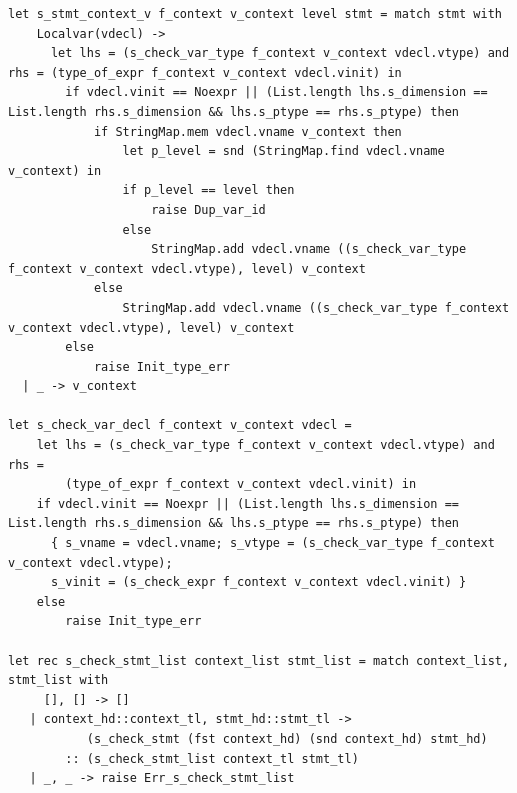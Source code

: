 \documentclass[a4paper,12pt]{article}
\begin{document}
\begin{lstlisting}
let s_stmt_context_v f_context v_context level stmt = match stmt with
    Localvar(vdecl) ->
      let lhs = (s_check_var_type f_context v_context vdecl.vtype) and rhs = (type_of_expr f_context v_context vdecl.vinit) in
        if vdecl.vinit == Noexpr || (List.length lhs.s_dimension == List.length rhs.s_dimension && lhs.s_ptype == rhs.s_ptype) then
            if StringMap.mem vdecl.vname v_context then
                let p_level = snd (StringMap.find vdecl.vname v_context) in
                if p_level == level then
                    raise Dup_var_id
                else
                    StringMap.add vdecl.vname ((s_check_var_type f_context v_context vdecl.vtype), level) v_context 
            else
                StringMap.add vdecl.vname ((s_check_var_type f_context v_context vdecl.vtype), level) v_context 
        else
            raise Init_type_err
  | _ -> v_context

let s_check_var_decl f_context v_context vdecl =
    let lhs = (s_check_var_type f_context v_context vdecl.vtype) and rhs =
        (type_of_expr f_context v_context vdecl.vinit) in
    if vdecl.vinit == Noexpr || (List.length lhs.s_dimension == List.length rhs.s_dimension && lhs.s_ptype == rhs.s_ptype) then
      { s_vname = vdecl.vname; s_vtype = (s_check_var_type f_context v_context vdecl.vtype); 
      s_vinit = (s_check_expr f_context v_context vdecl.vinit) }
    else
        raise Init_type_err

let rec s_check_stmt_list context_list stmt_list = match context_list, stmt_list with
     [], [] -> []
   | context_hd::context_tl, stmt_hd::stmt_tl -> 
           (s_check_stmt (fst context_hd) (snd context_hd) stmt_hd)
        :: (s_check_stmt_list context_tl stmt_tl)
   | _, _ -> raise Err_s_check_stmt_list


\end{lstlisting}
\end{document}
